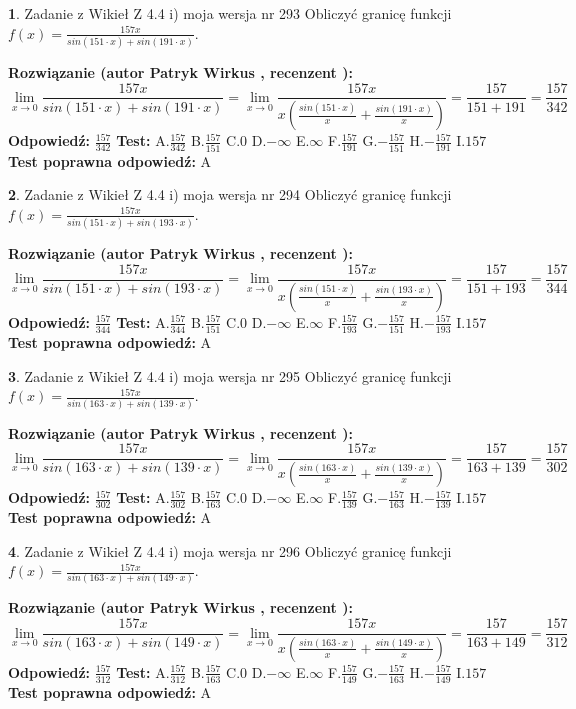 \documentclass[12pt, a4paper]{article}
\theoremstyle{definition} %
\newtheorem{zad}{}
\newcommand{\zadStart}[1]{\begin{zad}#1\newline}
\newcommand{\zadStop}{\end{zad}}
\newcommand{\rozwStart}[2]{\noindent \textbf{Rozwiązanie (autor #1 , recenzent #2): }\newline}
\newcommand{\rozwStop}{\newline}
\newcommand{\odpStart}{\noindent \textbf{Odpowiedź:}\newline}
\newcommand{\odpStop}{\newline}
\newcommand{\testStart}{\noindent \textbf{Test:}\newline}
\newcommand{\testStop}{\newline}
\newcommand{\kluczStart}{\noindent \textbf{Test poprawna odpowiedź:}\newline}
\newcommand{\kluczStop}{\newline}
\begin{document}
\zadStart{Zadanie z Wikieł Z 4.4 i) moja wersja nr 293}
Obliczyć granicę funkcji $f(x)=\frac{157x}{sin(151\cdot x) +sin(191\cdot x)}$.
\zadStop
\rozwStart{Patryk Wirkus}{}
$$\lim\limits_{x\to 0}\frac{157x}{sin(151\cdot x) +sin(191\cdot x)}=\lim\limits_{x\to 0}\frac{157x}{x(\frac{sin(151\cdot x)}{x}+\frac{sin(191\cdot x)}{x})}=\frac{157}{151+191} = \frac{157}{342}$$
\rozwStop
\odpStart
$\frac{157}{342}$
\odpStop
\testStart
A.$\frac{157}{342}$
B.$\frac{157}{151}$
C.$0$
D.$-\infty$
E.$\infty$
F.$\frac{157}{191}$
G.$-\frac{157}{151}$
H.$-\frac{157}{191}$
I.$157$
\testStop
\kluczStart
A
\kluczStop



\zadStart{Zadanie z Wikieł Z 4.4 i) moja wersja nr 294}
Obliczyć granicę funkcji $f(x)=\frac{157x}{sin(151\cdot x) +sin(193\cdot x)}$.
\zadStop
\rozwStart{Patryk Wirkus}{}
$$\lim\limits_{x\to 0}\frac{157x}{sin(151\cdot x) +sin(193\cdot x)}=\lim\limits_{x\to 0}\frac{157x}{x(\frac{sin(151\cdot x)}{x}+\frac{sin(193\cdot x)}{x})}=\frac{157}{151+193} = \frac{157}{344}$$
\rozwStop
\odpStart
$\frac{157}{344}$
\odpStop
\testStart
A.$\frac{157}{344}$
B.$\frac{157}{151}$
C.$0$
D.$-\infty$
E.$\infty$
F.$\frac{157}{193}$
G.$-\frac{157}{151}$
H.$-\frac{157}{193}$
I.$157$
\testStop
\kluczStart
A
\kluczStop



\zadStart{Zadanie z Wikieł Z 4.4 i) moja wersja nr 295}
Obliczyć granicę funkcji $f(x)=\frac{157x}{sin(163\cdot x) +sin(139\cdot x)}$.
\zadStop
\rozwStart{Patryk Wirkus}{}
$$\lim\limits_{x\to 0}\frac{157x}{sin(163\cdot x) +sin(139\cdot x)}=\lim\limits_{x\to 0}\frac{157x}{x(\frac{sin(163\cdot x)}{x}+\frac{sin(139\cdot x)}{x})}=\frac{157}{163+139} = \frac{157}{302}$$
\rozwStop
\odpStart
$\frac{157}{302}$
\odpStop
\testStart
A.$\frac{157}{302}$
B.$\frac{157}{163}$
C.$0$
D.$-\infty$
E.$\infty$
F.$\frac{157}{139}$
G.$-\frac{157}{163}$
H.$-\frac{157}{139}$
I.$157$
\testStop
\kluczStart
A
\kluczStop



\zadStart{Zadanie z Wikieł Z 4.4 i) moja wersja nr 296}
Obliczyć granicę funkcji $f(x)=\frac{157x}{sin(163\cdot x) +sin(149\cdot x)}$.
\zadStop
\rozwStart{Patryk Wirkus}{}
$$\lim\limits_{x\to 0}\frac{157x}{sin(163\cdot x) +sin(149\cdot x)}=\lim\limits_{x\to 0}\frac{157x}{x(\frac{sin(163\cdot x)}{x}+\frac{sin(149\cdot x)}{x})}=\frac{157}{163+149} = \frac{157}{312}$$
\rozwStop
\odpStart
$\frac{157}{312}$
\odpStop
\testStart
A.$\frac{157}{312}$
B.$\frac{157}{163}$
C.$0$
D.$-\infty$
E.$\infty$
F.$\frac{157}{149}$
G.$-\frac{157}{163}$
H.$-\frac{157}{149}$
I.$157$
\testStop
\kluczStart
A
\kluczStop
\end{document}
